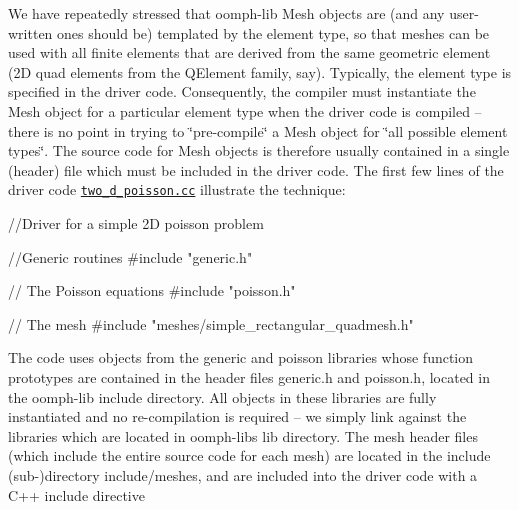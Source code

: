 We have repeatedly stressed that {\ttfamily oomph-\/lib} {\ttfamily Mesh} objects are (and any user-\/written ones should be) templated by the element type, so that meshes can be used with all finite elements that are derived from the same geometric element (2D quad elements from the {\ttfamily Q\+Element} family, say). Typically, the element type is specified in the driver code. Consequently, the compiler must instantiate the {\ttfamily Mesh} object for a particular element type when the driver code is compiled -- there is no point in trying to \char`\"{}pre-\/compile\char`\"{} a {\ttfamily Mesh} object for \char`\"{}all possible element types\char`\"{}. The source code for {\ttfamily Mesh} objects is therefore usually contained in a single (header) file which must be included in the driver code. The first few lines of the driver code \href{../../../../demo_drivers/poisson/two_d_poisson/two_d_poisson.cc}{\tt two\+\_\+d\+\_\+poisson.\+cc} illustrate the technique\+:

 
\begin{DoxyCodeInclude}
\textcolor{comment}{//Driver for a simple 2D poisson problem}

\textcolor{comment}{//Generic routines}
\textcolor{preprocessor}{#include "generic.h"}

\textcolor{comment}{// The Poisson equations}
\textcolor{preprocessor}{#include "poisson.h"}

\textcolor{comment}{// The mesh}
\textcolor{preprocessor}{#include "meshes/simple\_rectangular\_quadmesh.h"}

\end{DoxyCodeInclude}


The code uses objects from the {\ttfamily generic} and {\ttfamily poisson} libraries whose function prototypes are contained in the header files {\ttfamily generic.\+h} and {\ttfamily poisson.\+h}, located in the {\ttfamily oomph-\/lib} {\ttfamily include} directory. All objects in these libraries are fully instantiated and no re-\/compilation is required -- we simply link against the libraries which are located in {\ttfamily oomph-\/lib\textquotesingle{}s} {\ttfamily lib} directory. The mesh header files (which include the entire source code for each mesh) are located in the include (sub-\/)directory {\ttfamily include/meshes}, and are included into the driver code with a C++ include directive

